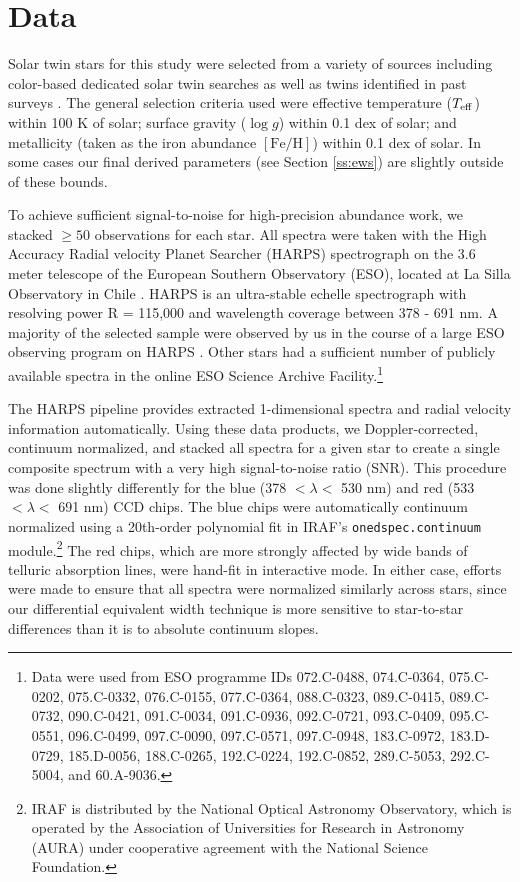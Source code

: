 \documentclass[twocolumn]{aastex62}
\newcommand{\teff}{$T_{\rm eff}$}
\newcommand{\logg}{$\log g$}
\newcommand{\feh}{$\mathrm{[Fe/H]}$}
\newcommand{\acronym}[1]{{\small{#1}}}
\begin{document}
\section{Data}

Solar twin stars for this study were selected from a variety of sources including color-based dedicated solar twin searches \citep{melendez07,ramirez09,melendez09} as well as twins identified in past surveys \citep{valenti05,baumann10,bensby14}. The general selection criteria used were effective temperature (\teff) within 100 K of solar; surface gravity (\logg) within 0.1 dex of solar; and metallicity (taken as the iron abundance \feh) within 0.1 dex of solar. In some cases our final derived parameters (see Section \ref{ss:ews}) are slightly outside of these bounds.

To achieve sufficient signal-to-noise for high-precision abundance work, we stacked $\ge50$ observations for each star. 
All spectra were taken with the High Accuracy Radial velocity Planet Searcher (\acronym{HARPS}) spectrograph on the 3.6 meter telescope of the European Southern Observatory (\acronym{ESO}), located at La Silla Observatory in Chile \citep{mayor03}.
\acronym{HARPS} is an ultra-stable echelle spectrograph with resolving power R = 115,000 and wavelength coverage between 378 - 691 nm.
A majority of the selected sample were observed by us in the course of a large \acronym{ESO} observing program on \acronym{HARPS} \citep{melendez15}. Other stars had a sufficient number of publicly available spectra in the online \acronym{ESO} Science Archive Facility.\footnote{Data were used from \acronym{ESO} programme IDs 072.C-0488, 074.C-0364, 075.C-0202, 075.C-0332, 076.C-0155, 077.C-0364, 088.C-0323, 089.C-0415, 089.C-0732, 090.C-0421, 091.C-0034, 091.C-0936, 092.C-0721, 093.C-0409, 095.C-0551, 096.C-0499, 097.C-0090, 097.C-0571, 097.C-0948, 183.C-0972, 183.D-0729, 185.D-0056, 188.C-0265, 192.C-0224, 192.C-0852, 289.C-5053, 292.C-5004, and 60.A-9036.}

The \acronym{HARPS} pipeline provides extracted 1-dimensional spectra and radial velocity information automatically. Using these data products, we Doppler-corrected, continuum normalized, and stacked all spectra for a given star to create a single composite spectrum with a very high signal-to-noise ratio (\acronym{SNR}). This procedure was done slightly differently for the blue (378 $< \lambda <$ 530 nm) and red (533 $< \lambda <$ 691 nm) CCD chips. The blue chips were automatically continuum normalized using a 20th-order polynomial fit in IRAF's \texttt{onedspec.continuum} module.\footnote{IRAF is distributed by the National Optical Astronomy Observatory, which is operated by the Association of Universities for Research in Astronomy (AURA) under cooperative agreement with the National Science Foundation.} The red chips, which are more strongly affected by wide bands of telluric absorption lines, were hand-fit in interactive mode. In either case, efforts were made to ensure that all spectra were normalized similarly across stars, since our differential equivalent width technique is more sensitive to star-to-star differences than it is to absolute continuum slopes.
\end{document}
